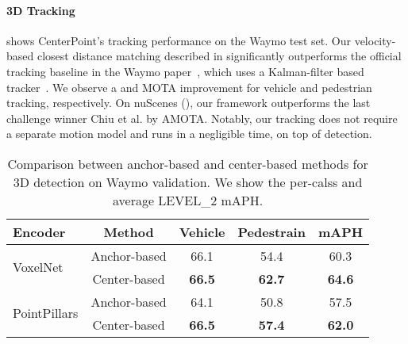 \documentclass[final]{cvpr}
\begin{document}
\paragraph{3D Tracking} 
 shows CenterPoint's tracking performance on the Waymo test set. 
Our velocity-based closest distance matching described in  significantly outperforms the official tracking baseline in the Waymo paper~\cite{sun2019scalability}, which uses a Kalman-filter based tracker~\cite{weng2019baseline}.
We observe a  and  MOTA improvement for vehicle and pedestrian tracking, respectively.
On nuScenes (), our framework outperforms the last challenge winner Chiu et al. \cite{chiu2020probabilistic} by  AMOTA. 
Notably, our tracking does not require a separate motion model and runs in a negligible time,  on top of detection.


{
\begin{table}[t]
\small
\begin{center}
\begin{tabular}{l@{\ \ }c@{\ \ }c@{\ \ }c@{\ \ }c}
  \toprule 
  Encoder & Method & Vehicle & Pedestrain & mAPH \\
  \midrule 
    \multirow{2}{5em}{VoxelNet}
   & Anchor-based & 66.1 & 54.4 & 60.3  \\
   & Center-based &  \textbf{66.5} & \textbf{62.7} & \textbf{64.6}  \\
  \midrule
    \multirow{2}{5em}{PointPillars}
  & Anchor-based  &  64.1 & 50.8 & 57.5   \\ 
  & Center-based &  \textbf{66.5} & \textbf{57.4} & \textbf{62.0}  \\
\bottomrule
 \end{tabular}
\end{center}
\vspace{-5mm}
\caption{Comparison between anchor-based and center-based methods for 3D detection on Waymo validation. We show the per-calss and average LEVEL\_2 mAPH.}
\end{table}
}
\end{document}
